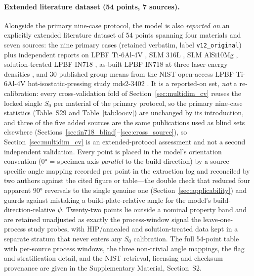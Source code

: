 \paragraph{Extended literature dataset (54 points, 7 sources).}
Alongside the primary nine-case protocol, the model is also \emph{reported on} an explicitly extended literature dataset of 54 points spanning four materials and seven sources: the nine primary cases (retained verbatim, label \texttt{v12\_original}) plus independent reports on LPBF Ti-6Al-4V \cite{sun2024ti64adem}, SLM 316L \cite{hitzler2017materials}, SLM AlSi10Mg \cite{metals2018alsi_aniso}, solution-treated LPBF IN718 \cite{hovig2018in718}, as-built LPBF IN718 at three laser-energy densities \cite{watring2020addma}, and 30 published group means from the NIST open-access LPBF Ti-6Al-4V hot-isostatic-pressing study mds2-3402 \cite{nisthip_ti64,nistir8551}. It is a reported-on set, \emph{not} a re-calibration: every cross-validation fold of Section~\ref{sec:multidim_cv} reuses the locked single $S_0$ per material of the primary protocol, so the primary nine-case statistics (Table~S29 and Table~\ref{tab:loocv}) are unchanged by its introduction, and three of the five added sources are the same publications used as blind sets elsewhere (Sections~\ref{sec:in718_blind}--\ref{sec:cross_source}), so Section~\ref{sec:multidim_cv} is an extended-protocol assessment and not a second independent validation. Every point is placed in the model's orientation convention ($\ang{0}$ = specimen axis \emph{parallel} to the build direction) by a source-specific angle mapping recorded per point in the extraction log and reconciled by two authors against the cited figure or table---the double check that reduced four apparent $\ang{90}$ reversals to the single genuine one (Section~\ref{sec:applicability}) and guards against mistaking a build-plate-relative angle for the model's build-direction-relative $\psi$. Twenty-two points lie outside a nominal property band and are retained unadjusted as exactly the process-window signal the leave-one-process study probes, with HIP/annealed and solution-treated data kept in a separate stratum that never enters any $S_0$ calibration. The full 54-point table with per-source process windows, the three non-trivial angle mappings, the flag and stratification detail, and the NIST retrieval, licensing and checksum provenance are given in the Supplementary Material, Section~S2.



